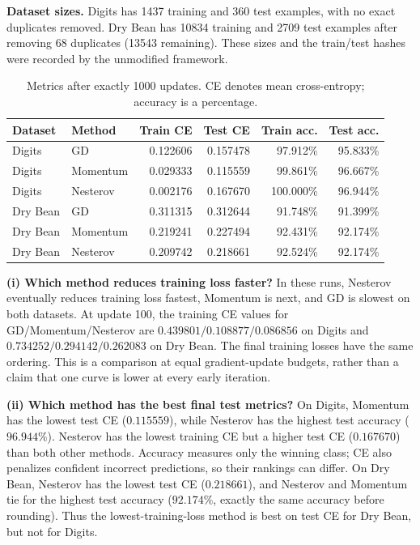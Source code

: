 \textbf{Dataset sizes.} Digits has 1437 training and 360 test examples, with no exact duplicates removed. Dry Bean has 10834 training and 2709 test examples after removing 68 duplicates (13543 remaining). These sizes and the train/test hashes were recorded by the unmodified framework.

\begin{table}[htbp]\centering\small
\caption{Metrics after exactly 1000 updates. CE denotes mean cross-entropy; accuracy is a percentage.}\label{tab:p2}
\begin{tabular}{@{}llrrrr@{}}\toprule
Dataset & Method & Train CE & Test CE & Train acc. & Test acc.\\\midrule
Digits & GD & 0.122606 & 0.157478 & 97.912\% & 95.833\%\\
Digits & Momentum & 0.029333 & 0.115559 & 99.861\% & 96.667\%\\
Digits & Nesterov & 0.002176 & 0.167670 & 100.000\% & 96.944\%\\
Dry Bean & GD & 0.311315 & 0.312644 & 91.748\% & 91.399\%\\
Dry Bean & Momentum & 0.219241 & 0.227494 & 92.431\% & 92.174\%\\
Dry Bean & Nesterov & 0.209742 & 0.218661 & 92.524\% & 92.174\%\\
\bottomrule\end{tabular}\end{table}

\textbf{(i) Which method reduces training loss faster?} In these runs, Nesterov eventually reduces training loss fastest, Momentum is next, and GD is slowest on both datasets. At update 100, the training CE values for GD/Momentum/Nesterov are $0.439801/0.108877/0.086856$ on Digits and $0.734252/0.294142/0.262083$ on Dry Bean. The final training losses have the same ordering. This is a comparison at equal gradient-update budgets, rather than a claim that one curve is lower at every early iteration.

\textbf{(ii) Which method has the best final test metrics?} On Digits, Momentum has the lowest test CE ($0.115559$), while Nesterov has the highest test accuracy ($96.944\%$). Nesterov has the lowest training CE but a higher test CE ($0.167670$) than both other methods. Accuracy measures only the winning class; CE also penalizes confident incorrect predictions, so their rankings can differ. On Dry Bean, Nesterov has the lowest test CE ($0.218661$), and Nesterov and Momentum tie for the highest test accuracy ($92.174\%$, exactly the same accuracy before rounding). Thus the lowest-training-loss method is best on test CE for Dry Bean, but not for Digits.

